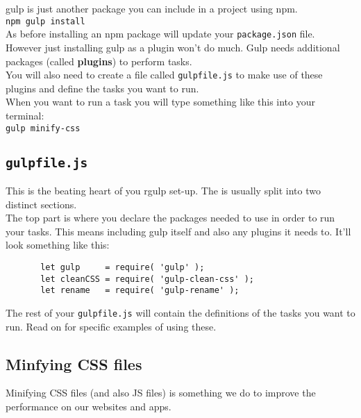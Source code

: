 gulp is just another package you can include in a project using npm.
\\

\texttt{npm gulp install}
\\

As before installing an npm package will update your \texttt{package.json} file.
\\

However just installing gulp as a plugin won't do much. Gulp needs additional packages (called \textbf{plugins}) to perform tasks.
\\

You will also need to create a file called \texttt{gulpfile.js} to make use of these plugins and define the tasks you want to run.
\\

When you want to run a task you will type something like this into your terminal:
\\

\texttt{gulp minify-css}


\subsection{\texttt{gulpfile.js}}

This is the beating heart of you rgulp set-up. The is usually split into two distinct sections.
\\

The top part is where you declare the packages needed to use in order to run your tasks. This means including gulp itself and also any plugins it needs to. It'll look something like this:
\\

	\begin{verbatim}
       let gulp     = require( 'gulp' );
       let cleanCSS = require( 'gulp-clean-css' );
       let rename   = require( 'gulp-rename' );
	\end{verbatim}

The rest of your \texttt{gulpfile.js} will contain the definitions of the tasks you want to run. Read on for specific examples of using these.
\\

\subsection{Minfying CSS files}

Minifying CSS files (and also JS files) is something we do to improve the performance on our websites and apps.
\\

